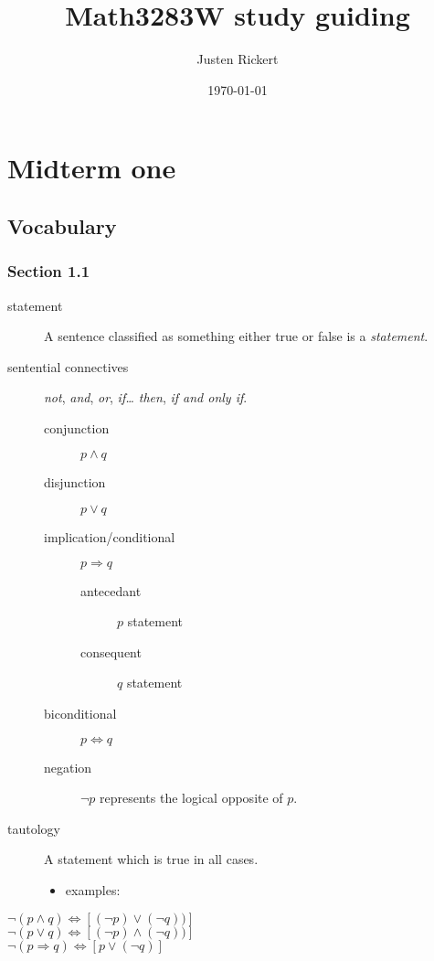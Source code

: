 \documentclass[12pt]{article}
\author{Justen Rickert}
\date{\today}
\title{Math3283W study guiding}
\begin{document}
\maketitle
\tableofcontents

\theoremstyle{definition}
\newtheorem{definition}{Definition}
\renewcommand\qedsymbol{$\blacksquare$}

\newtheorem{lemma}[Theorem]{lemma}
\theoremstyle{definition}
\newtheorem{definition}{Def}[section]
\newtheorem*{remark}{Remark}
\newtheorem*{corollary}{Corollary}

\section{Midterm one}
\label{sec:orge6e0d28}
\subsection{Vocabulary}
\label{sec:org9017b11}
\subsubsection{Section 1.1}
\label{sec:orge6f37f4}
\begin{description}
\item[{statement}] A sentence classified as something either true or false is a
\emph{statement}.
\item[{sentential connectives}] \emph{not}, \emph{and}, \emph{or}, \emph{if\dots{} then}, \emph{if and only if}.
\begin{description}
\item[{conjunction}] \(p\land{}q\)
\item[{disjunction}] \(p\lor{}q\)
\item[{implication/conditional}] \(p\Rightarrow{}q\)
\begin{description}
\item[{antecedant}] \(p\) statement
\item[{consequent}] \(q\) statement
\end{description}
\item[{biconditional}] \(p\Leftrightarrow{}q\)
\item[{negation}] \(\neg{}p\) represents the logical opposite of \(p\).
\end{description}
\item[{tautology}] A statement which is true in all cases.
\begin{itemize}
\item examples:
\end{itemize}
\end{description}
\begin{center}
\(\neg(p\land{}q)\Leftrightarrow[(\neg{}p)\lor(\neg{}q))]\) \\
\(\neg(p\lor{}q)\Leftrightarrow[(\neg{}p)\land(\neg{}q))]\) \\
\(\neg(p\Rightarrow{}q)\Leftrightarrow[p\lor(\neg{}q)]\) \\
\end{center}
\end{document}
